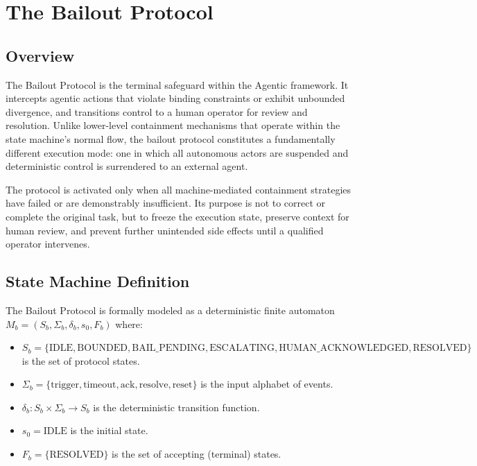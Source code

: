 \section{The Bailout Protocol}

\subsection{Overview}

The Bailout Protocol is the terminal safeguard within the Agentic framework. It intercepts agentic actions that violate binding constraints or exhibit unbounded divergence, and transitions control to a human operator for review and resolution. Unlike lower-level containment mechanisms that operate within the state machine's normal flow, the bailout protocol constitutes a fundamentally different execution mode: one in which all autonomous actors are suspended and deterministic control is surrendered to an external agent.

The protocol is activated only when all machine-mediated containment strategies have failed or are demonstrably insufficient. Its purpose is not to correct or complete the original task, but to freeze the execution state, preserve context for human review, and prevent further unintended side effects until a qualified operator intervenes.

\subsection{State Machine Definition}

The Bailout Protocol is formally modeled as a deterministic finite automaton $M_b = (S_b, \Sigma_b, \delta_b, s_0, F_b)$ where:

\begin{itemize}
    \item $S_b = \{\text{IDLE}, \text{BOUNDED}, \text{BAIL\_PENDING}, \text{ESCALATING}, \text{HUMAN\_ACKNOWLEDGED}, \text{RESOLVED}\}$ is the set of protocol states.
    \item $\Sigma_b = \{\text{trigger}, \text{timeout}, \text{ack}, \text{resolve}, \text{reset}\}$ is the input alphabet of events.
    \item $\delta_b: S_b \times \Sigma_b \rightarrow S_b$ is the deterministic transition function.
    \item $s_0 = \text{IDLE}$ is the initial state.
    \item $F_b = \{\text{RESOLVED}\}$ is the set of accepting (terminal) states.
\end{itemize}


